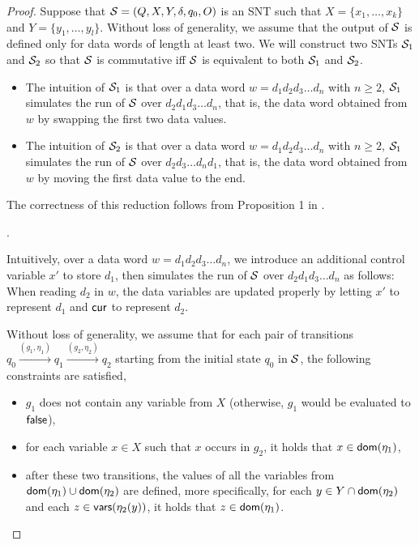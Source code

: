\begin{appendix}
\begin{proof}
Suppose that ${\mathcal{S} }=(Q, X, Y, \delta, q_0, O)$ is an SNT such that $X=\{x_1,\dots,x_k\}$ and $Y=\{y_1,\dots,y_l\}$. Without loss of generality, we assume that the output of ${\mathcal{S} }$ is defined only for data words of length at least two. We will construct two SNTs ${\mathcal{S} }_1$ and ${\mathcal{S} }_2$ so that ${\mathcal{S} }$ is commutative iff ${\mathcal{S} }$ is equivalent to both ${\mathcal{S} }_1$ and ${\mathcal{S} }_2$.
\begin{itemize}
\item The intuition of ${\mathcal{S} }_1$ is that over a data word $w=d_1 d_2 d_3 \dots d_n$ with $n\ge 2$, ${\mathcal{S} }_1$ simulates the run of ${\mathcal{S} }$ over $d_2 d_1 d_3 \dots d_n$, that is, the data word obtained from $w$ by swapping the first two data values.
%
\item The intuition of ${\mathcal{S} }_2$ is that over a data word $w=d_1 d_2 d_3 \dots d_n$ with $n\ge 2$, ${\mathcal{S} }_1$ simulates the run of ${\mathcal{S} }$ over $d_2 d_3 \dots d_n d_1$, that is, the data word obtained from $w$ by moving the first data value to the end. 
\end{itemize}
The correctness of this reduction follows from Proposition 1 in \cite{CHSW15}.

\smallskip

.

Intuitively, over a data word $w=d_1d_2 d_3 \dots d_n$, we introduce an additional control variable $x'$ to store $d_1$, then simulates the run of ${\mathcal{S} }$ over $d_2 d_1 d_3 \dots d_n$ as follows: When reading $d_2$ in $w$, the data variables are updated properly by letting $x'$ to represent $d_1$ and $\mathsf{cur}$ to represent $d_2$.

Without loss of generality, we assume that for each pair of transitions $q_0 \xrightarrow{(g_1,\eta_1)} q_1 \xrightarrow{(g_2,\eta_2)} q_2$ starting from the initial state $q_0$ in ${\mathcal{S} }$, the following constraints are satisfied,
\begin{itemize}
\item $g_1$ does not contain any variable from $X$ (otherwise, $g_1$ would be evaluated to $\mathsf{false}$),
%
\item for each variable $x \in X$ such that $x$ occurs in $g_2$, it holds that $x \in \mathsf{dom}(\eta_1)$,
%
\item after these two transitions, the values of all the variables from $\mathsf{dom}(\eta_1) \cup \mathsf{dom}(\eta_2)$ are defined, more specifically, for each $y \in Y \cap \mathsf{dom}(\eta_2)$ and each $z \in \mathsf{vars}(\eta_2(y))$, it holds that $z \in \mathsf{dom}(\eta_1)$.
\end{itemize}


\end{proof}
\end{appendix}
